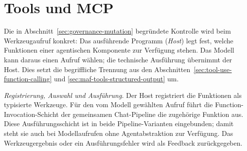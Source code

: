 
\section{Tools und MCP}
\label{sec:realisierung-tools-mcp}

Die in Abschnitt~\ref{sec:governance-mutation} begründete Kontrolle
wird beim Werkzeugaufruf konkret: Das ausführende Programm
(\emph{Host}) legt fest, welche Funktionen einer agentischen
Komponente zur Verfügung stehen. Das Modell kann daraus einen
Aufruf wählen; die technische Ausführung übernimmt der Host. Dies setzt
die begriffliche Trennung aus den
Abschnitten~\ref{sec:tool-use-function-calling} und
\ref{sec:maf-tools-structured-output} um.

\emph{Registrierung, Auswahl und Ausführung.} Der Host registriert
die Funktionen als typisierte Werkzeuge. Für den vom Modell
gewählten Aufruf führt die Function-Invocation-Schicht der
gemeinsamen Chat-Pipeline die zugehörige Funktion aus. Diese
Ausführungsschicht ist in beide Pipeline-Varianten eingebunden;
damit steht sie auch bei Modellaufrufen ohne Agentabstraktion zur
Verfügung. Das Werkzeugergebnis oder ein Ausführungsfehler wird
als Feedback zurückgegeben.

